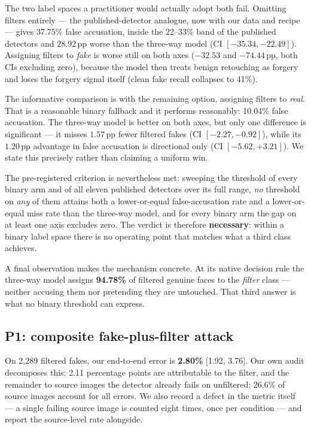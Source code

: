 \documentclass[conference]{IEEEtran}
\begin{document}
The two label spaces a practitioner would actually adopt both fail. Omitting filters
entirely --- the published-detector analogue, now with our data and recipe --- gives 37.75\%
false accusation, inside the 22--33\% band of the published detectors and
$28.92$\,pp worse than the three-way model (CI $[-35.34, -22.49]$). Assigning filters to
\emph{fake} is worse still on both axes ($-32.53$ and $-74.44$\,pp, both CIs excluding zero),
because the model then treats benign retouching as forgery and loses the forgery signal
itself (clean fake recall collapses to 41\%).

The informative comparison is with the remaining option, assigning filters to \emph{real}.
That is a reasonable binary fallback and it performs reasonably: 10.04\% false accusation.
The three-way model is better on both axes, but only one difference is significant --- it
misses $1.57$\,pp fewer filtered fakes (CI $[-2.27, -0.92]$), while its $1.20$\,pp advantage
in false accusation is directional only (CI $[-5.62, +3.21]$). We state this precisely
rather than claiming a uniform win.

The pre-registered criterion is nevertheless met: sweeping the threshold of every binary arm
and of all eleven published detectors over its full range, \emph{no} threshold on \emph{any}
of them attains both a lower-or-equal false-accusation rate and a lower-or-equal miss rate
than the three-way model, and for every binary arm the gap on at least one axis excludes
zero. The verdict is therefore \textbf{necessary}: within a binary label space there is no
operating point that matches what a third class achieves.

A final observation makes the mechanism concrete. At its native decision rule the three-way
model assigns \textbf{94.78\%} of filtered genuine faces to the \emph{filter} class ---
neither accusing them nor pretending they are untouched. That third answer is what no
binary threshold can express.

\subsection{P1: composite fake-plus-filter attack}
\label{sec:p1}
On 2{,}289 filtered fakes, our end-to-end error is \textbf{2.80\%} [1.92, 3.76]. Our own
audit decomposes this: 2.11 percentage points are attributable to the filter, and the
remainder to source images the detector already fails on unfiltered; 26.6\% of source images
account for all errors. We also record a defect in the metric itself --- a single failing
source image is counted eight times, once per condition --- and report the source-level rate
alongside.
\end{document}
